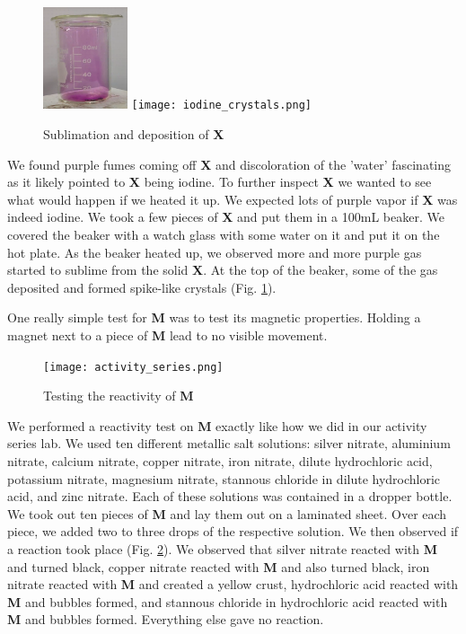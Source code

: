 \documentclass[titlepage]{article}
\begin{document}
\begin{figure}[h]
    \centering
    \includegraphics[height=3cm]{iodine_gas.png}
    \texttt{[image: iodine\_crystals.png]} 
    \caption{Sublimation and deposition of \textbf{X}}
    \label{fig:heated_x}
\end{figure}

We found purple fumes coming off \textbf{X} and discoloration of the 'water' fascinating as it likely pointed to \textbf{X} being iodine. To further inspect \textbf{X} we wanted to see what would happen if we heated it up. We expected lots of purple vapor if \textbf{X} was indeed iodine. We took a few pieces of \textbf{X} and put them in a 100\unit{\milli\liter} beaker. We covered the beaker with a watch glass with some water on it and put it on the hot plate. As the beaker heated up, we observed more and more purple gas started to sublime from the solid \textbf{X}. At the top of the beaker, some of the gas deposited and formed spike-like crystals (Fig. \ref{fig:heated_x}).

\bigskip
One really simple test for \textbf{M} was to test its magnetic properties. Holding a magnet next to a piece of \textbf{M} lead to no visible movement.

\begin{figure}[h]
    \centering
    \texttt{[image: activity\_series.png]} 
    \caption{Testing the reactivity of \textbf{M}}
    \label{fig:act_series}
\end{figure}

We performed a reactivity test on \textbf{M} exactly like how we did in our activity series lab. We used ten different metallic salt solutions: silver nitrate, aluminium nitrate, calcium nitrate, copper nitrate, iron nitrate, dilute hydrochloric acid, potassium nitrate, magnesium nitrate, stannous chloride in dilute hydrochloric acid, and zinc nitrate. Each of these solutions was contained in a dropper bottle. We took out ten pieces of \textbf{M} and lay them out on a laminated sheet. Over each piece, we added two to three drops of the respective solution. We then observed if a reaction took place (Fig. \ref{fig:act_series}). We observed that silver nitrate reacted with \textbf{M} and turned black, copper nitrate reacted with \textbf{M} and also turned black, iron nitrate reacted with \textbf{M} and created a yellow crust, hydrochloric acid reacted with \textbf{M} and bubbles formed, and stannous chloride in hydrochloric acid reacted with \textbf{M} and bubbles formed. Everything else gave no reaction.
\end{document}

